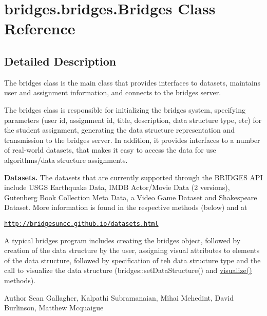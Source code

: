 \hypertarget{classbridges_1_1bridges_1_1_bridges}{}\section{bridges.\+bridges.\+Bridges Class Reference}
\label{classbridges_1_1bridges_1_1_bridges}


\subsection{Detailed Description}
The bridges class is the main class that provides interfaces to datasets, maintains user and assignment information, and connects to the bridges server. 

The bridges class is responsible for initializing the bridges system, specifying parameters (user id, assignment id, title, description, data structure type, etc) for the student assignment, generating the data structure representation and transmission to the bridges server. In addition, it provides interfaces to a number of real-\/world datasets, that makes it easy to access the data for use algorithms/data structure assignments. ~\newline


{\bfseries Datasets.} The datasets that are currently supported through the B\+R\+I\+D\+G\+ES A\+PI include U\+S\+GS Earthquake Data, I\+M\+DB Actor/\+Movie Data (2 versions), Gutenberg Book Collection Meta Data, a Video Game Dataset and Shakespeare Dataset. More information is found in the respective methods (below) and at 

\href{http://bridgesuncc.github.io/datasets.html}{\tt http\+://bridgesuncc.\+github.\+io/datasets.\+html} 

A typical bridges program includes creating the bridges object, followed by creation of the data structure by the user, assigning visual attributes to elements of the data structure, followed by specification of teh data structure type and the call to visualize the data structure (bridges\+::set\+Data\+Structure() and \mbox{\hyperlink{classbridges_1_1bridges_1_1_bridges_a3c1321f8be7b249639a47eba10b67c70}{visualize()}} methods).

\begin{DoxyAuthor}{Author}
Sean Gallagher, Kalpathi Subramanaian, Mihai Mehedint, David Burlinson, Matthew Mcquaigue 
\end{DoxyAuthor}
